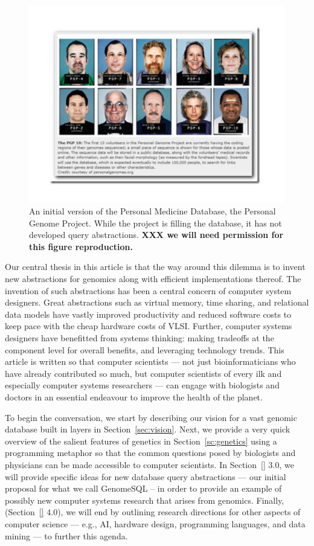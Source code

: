 \documentclass[10pt,fullpage]{article}
\begin{document}
\begin{figure}[h!]
  \centering
  \includegraphics[trim = 0mm 20mm 0mm 20mm,clip, width=6in]{fig/PMD.pdf}
  \caption{An initial version of the Personal Medicine Database, the
    Personal Genome Project.  While the project is filling the
    database, it has not developed query abstractions. {\bf XXX we
      will need permission for this figure reproduction.}}
  \label{fig:PMD}
\end{figure}

Our central thesis in this article is that the way around this dilemma
is to invent new abstractions for genomics along with efficient
implementations thereof.  The invention of such abstractions has been
a central concern of computer system designers.  Great abstractions
such as virtual memory, time sharing, and relational data models have
vastly improved productivity and reduced software costs to keep pace
with the cheap hardware costs of VLSI.  Further, computer systems
designers have benefitted from systems thinking: making tradeoffs at
the component level for overall benefits, and leveraging technology
trends. This article is written so that computer scientists --- not
just bioinformaticians who have already contributed so much, but
computer scientists of every ilk and especially computer systems
researchers --- can engage with biologists and doctors in an essential
endeavour to improve the health of the planet.

                    
To begin the conversation, we start by describing our vision for a
vast genomic database built in layers in Section~\ref{sec:vision}.  Next, we
provide a very quick overview of the salient features of genetics in
Section~\ref{sc:genetics} using a programming metaphor so that the common questions
posed by biologists and physicians can be made accessible to computer
scientists.  In Section~\ref{} 3.0, we will provide specific ideas for new
database query abstractions --- our initial proposal for what we call
GenomeSQL -- in order to provide an example of possibly new computer
systems research that arises from genomics.  Finally, (Section~\ref{} 4.0),
we will end by outlining research directions for other aspects of
computer science --- e.g., AI, hardware design, programming languages,
and data mining --- to further this agenda.
\end{document}
